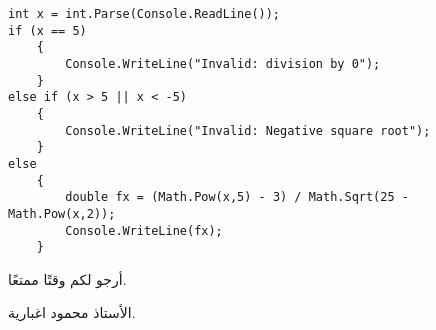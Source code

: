 \documentclass[12pt]{article}
\begin{document}
\begin{enumerate}[itemsep=2em]
\ifwithsols
\begin{boxSolution}
\begin{english}
\begin{verbatim}
int x = int.Parse(Console.ReadLine());
if (x == 5)
    {
        Console.WriteLine("Invalid: division by 0");
    }
else if (x > 5 || x < -5)
    {
        Console.WriteLine("Invalid: Negative square root");
    }
else
    {
        double fx = (Math.Pow(x,5) - 3) / Math.Sqrt(25 - Math.Pow(x,2));
        Console.WriteLine(fx);
    }
\end{verbatim}
\end{english}
\end{boxSolution}
\fi

\end{enumerate}

\vspace{3cm}
\begin{flushleft}
أرجو لكم وقتًا ممتعًا.

الأستاذ محمود اغبارية.
\end{flushleft}
\end{document}
